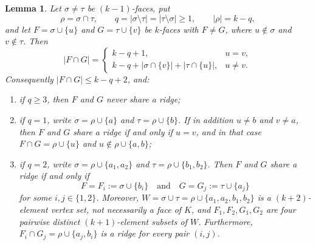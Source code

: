 \documentclass[11pt,reqno]{amsart}
\numberwithin{equation}{section}
\theoremstyle{plain}
\newtheorem{lemma}[theorem]{Lemma}
\theoremstyle{definition}
\begin{document}
\begin{lemma}\label{lem:adj}
Let $\sigma\ne\tau$ be $(k-1)$-faces, put
\[
  \rho=\sigma\cap\tau,\qquad q=|\sigma\setminus\tau|=|\tau\setminus\sigma|\ge1,
  \qquad |\rho|=k-q ,
\]
and let $F=\sigma\cup\{u\}$ and $G=\tau\cup\{v\}$ be $k$-faces with $F\ne G$, where
$u\notin\sigma$ and $v\notin\tau$. Then
\[
  |F\cap G|=
  \begin{cases}
    k-q+1, & u=v,\\[2pt]
    k-q+|\sigma\cap\{v\}|+|\tau\cap\{u\}|, & u\ne v.
  \end{cases}
\]
Consequently $|F\cap G|\le k-q+2$, and:
\begin{enumerate}[label=\textup{(\alph*)},leftmargin=2.6em]
\item\label{it:adj-a} if $q\ge3$, then $F$ and $G$ never share a ridge;
\item\label{it:adj-b} if $q=1$, write $\sigma=\rho\cup\{a\}$ and $\tau=\rho\cup\{b\}$. If in
addition $u\ne b$ and $v\ne a$, then $F$ and $G$ share a ridge if and only if $u=v$, and in
that case $F\cap G=\rho\cup\{u\}$ and $u\notin\rho\cup\{a,b\}$;
\item\label{it:adj-c} if $q=2$, write $\sigma=\rho\cup\{a_1,a_2\}$ and
$\tau=\rho\cup\{b_1,b_2\}$. Then $F$ and $G$ share a ridge if and only if
\[
  F=F_i:=\sigma\cup\{b_i\}\quad\text{and}\quad G=G_j:=\tau\cup\{a_j\}
\]
for some $i,j\in\{1,2\}$. Moreover,
$W=\sigma\cup\tau=\rho\cup\{a_1,a_2,b_1,b_2\}$ is a $(k+2)$-element vertex set, not
necessarily a face of $K$, and $F_1,F_2,G_1,G_2$ are four pairwise distinct
$(k+1)$-element subsets of $W$. Furthermore,
$F_i\cap G_j=\rho\cup\{a_j,b_i\}$ is a ridge for \emph{every} pair $(i,j)$.
\end{enumerate}
\end{lemma}
\end{document}
